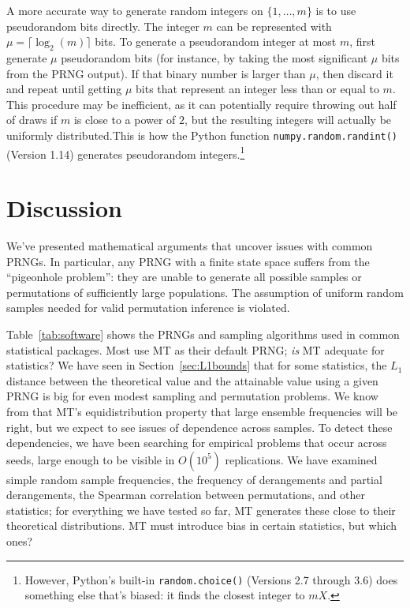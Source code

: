 \documentclass[graybox]{svmult}
\begin{document}
A more accurate way to generate random integers on $\{1, \dots, m\}$ is to use pseudorandom bits directly. 
The integer $m$ can be represented with $\mu = \lceil \log_2(m) \rceil$ bits. 
To generate a pseudorandom integer at most $m$, first generate $\mu$ pseudorandom bits (for instance, by taking the most significant $\mu$ bits from the PRNG output).  
If that binary number is larger than $\mu$, then discard it and repeat until getting $\mu$ bits that represent an integer less than or equal to $m$.
This procedure may be inefficient, as it can potentially require throwing out half of draws if $m$ is close to a power of $2$, but the resulting integers will actually be uniformly distributed.This is how the Python function \texttt{numpy.random.randint()} (Version 1.14) generates pseudorandom integers.\footnote{
However, Python's built-in \texttt{random.choice()} (Versions 2.7 through 3.6) does something else that's biased: it finds the closest integer to $mX$.
}


\section{Discussion}
\label{sec:discussion}

We've presented mathematical arguments that uncover issues with common PRNGs.
In particular, any PRNG with a finite state space suffers from the ``pigeonhole problem'':
they are unable to generate all possible samples or permutations of sufficiently large populations.
The assumption of uniform random samples needed for valid permutation inference is violated.

Table~\ref{tab:software} shows the PRNGs and sampling algorithms used in common statistical packages.
Most use MT as their default PRNG; \emph{is} MT adequate for statistics?
We have seen in Section~\ref{sec:L1bounds} that for some statistics, the $L_1$ distance between the theoretical value and the attainable value using a given PRNG
 is big for even modest sampling and permutation problems.
We know from that MT's equidistribution property that large ensemble frequencies will be right, but we expect to see issues of dependence across samples.
To detect these dependencies, we have been searching for empirical problems that occur across seeds, large enough to be visible in $O(10^5)$ replications.
We have examined simple random sample frequencies, the frequency of derangements and partial derangements, the Spearman correlation between permutations, 
and other statistics;
for everything we have tested so far, MT generates these close to their theoretical distributions.
MT must introduce bias in certain statistics, but which ones?
\end{document}
